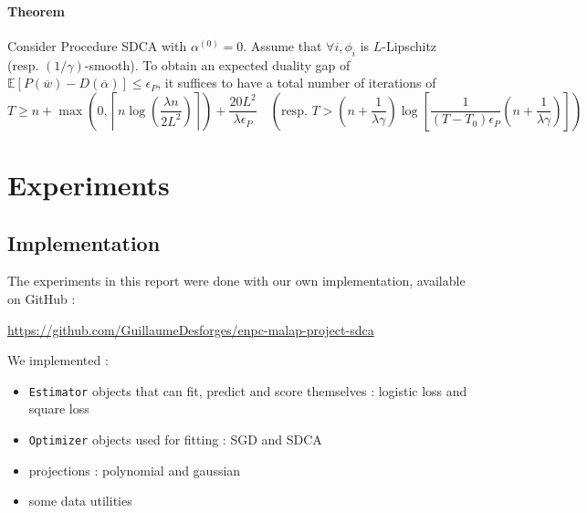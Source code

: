 \documentclass{article}
\begin{document}
\paragraph{Theorem} Consider Procedure SDCA with $\alpha^{(0)} = 0$.
Assume that $\forall i, \phi_i$ is $L$-Lipschitz (resp. $(1/\gamma)$-smooth).
To obtain an expected duality gap of $\mathbb{E}[P(\overline{w})-D(\overline{\alpha})] \leq \epsilon_P$, it suffices to have a total number of iterations of
$$T \geq n + \max\left(0, \left\lceil n \log \left(\dfrac{\lambda n}{2 L^2} \right) \right\rceil \right) + \dfrac{20 L^2}{\lambda \epsilon_P} \quad \left( \text{resp. } T > \left(n + \dfrac{1}{\lambda \gamma} \right) \log \left[ \dfrac{1}{(T-T_0)\epsilon_P} \left(n + \dfrac{1}{\lambda \gamma} \right) \right] \right)$$ 


\section{Experiments}

\subsection{Implementation}

The experiments in this report were done with our own implementation, available on GitHub :

\url{ https://github.com/GuillaumeDesforges/enpc-malap-project-sdca }

We implemented :

\begin{itemize}
	\item \texttt{Estimator} objects that can fit, predict and score themselves : logistic loss and square loss
	\item \texttt{Optimizer} objects used for fitting : SGD and SDCA
	\item projections : polynomial and gaussian
	\item some data utilities
\end{itemize}
\end{document}
